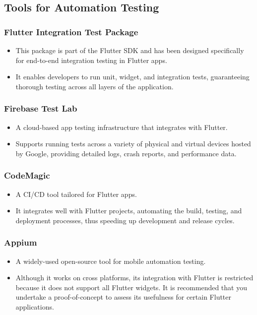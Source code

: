 \subsection{Tools for Automation Testing}
\subsubsection{Flutter Integration Test Package}
\begin{itemize}
    \item This package is part of the Flutter SDK and has been designed specifically for end-to-end integration testing in Flutter apps.
    \item It enables developers to run unit, widget, and integration tests, guaranteeing thorough testing across all layers of the application.
\end{itemize}
\subsubsection{Firebase Test Lab}
\begin{itemize}
    \item A cloud-based app testing infrastructure that integrates with Flutter.
    \item Supports running tests across a variety of physical and virtual devices hosted by Google, providing detailed logs, crash reports, and performance data.
\end{itemize}
\subsubsection{CodeMagic}
\begin{itemize}
    \item A CI/CD tool tailored for Flutter apps.
    \item It integrates well with Flutter projects, automating the build, testing, and deployment processes, thus speeding up development and release cycles.
\end{itemize}
\subsubsection{Appium}
\begin{itemize}
    \item A widely-used open-source tool for mobile automation testing.
    \item Although it works on cross platforms, its integration with Flutter is restricted because it does not support all Flutter widgets. It is recommended that you undertake a proof-of-concept to assess its usefulness for certain Flutter applications.
\end{itemize}

